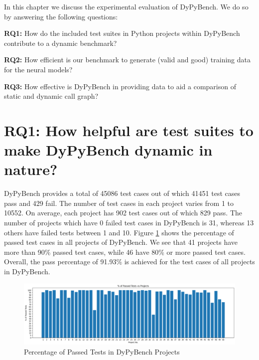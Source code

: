 In this chapter we discuss the experimental evaluation of DyPyBench. We do so by answering the following questions:

\textbf{RQ1:} How do the included test suites in Python projects within DyPyBench contribute to a dynamic benchmark?

\textbf{RQ2:} How efficient is our benchmark to generate (valid and good) training data for the neural models?

\textbf{RQ3:} How effective is DyPyBench in providing data to aid a comparison of static and dynamic call graph?

\section{RQ1: How helpful are test suites to make DyPyBench dynamic in nature?}

DyPyBench provides a total of 45086 test cases out of which 41451 test cases pass and 429 fail.   
The number of test cases in each project varies from 1 to 10552.
On average, each project has 902 test cases out of which 829 pass.  
The number of projects which have 0 failed test cases in DyPyBench is 31, whereas 13 others have failed tests between 1 and 10.
Figure \ref{fig:successful_tests} shows the percentage of passed test cases in all projects of DyPyBench.
We see that 41 projects have more than 90\% passed test cases, while 46 have 80\% or more passed test cases.
Overall, the pass percentage of 91.93\% is achieved for the test cases of all projects in DyPyBench.

\begin{figure}[ht]
    \centering
    \includegraphics[width=1\linewidth]{figures/evaluation/perc_passed_tests.png}
    \caption[Passed Test Case Percentage ]{\label{fig:successful_tests}Percentage of Passed Tests in DyPyBench Projects}
\end{figure}

